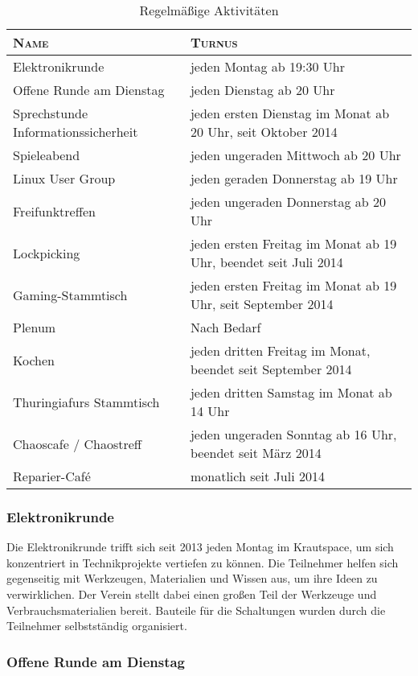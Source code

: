 \documentclass[ngerman]{scrartcl}
\begin{document}
\begin{table}[h]
  \centering{}
	\begin{tabularx}{\textwidth}{l|X}
          \toprule
		\textsc{Name} & \textsc{Turnus} \\ \midrule
		Elektronikrunde & jeden Montag ab 19:30 Uhr\\
		Offene Runde am Dienstag & jeden Dienstag ab 20 Uhr\\
		Sprechstunde Informationssicherheit & jeden ersten Dienstag im Monat ab 20 Uhr, seit Oktober 2014\\ 
		Spieleabend & jeden ungeraden Mittwoch ab 20 Uhr\\
		Linux User Group & jeden geraden Donnerstag ab 19 Uhr\\
		Freifunktreffen & jeden ungeraden Donnerstag ab 20 Uhr\\
		Lockpicking & jeden ersten Freitag im Monat ab 19 Uhr, beendet seit Juli 2014\\
		Gaming-Stammtisch & jeden ersten Freitag im Monat ab 19 Uhr, seit September 2014\\
		Plenum & Nach Bedarf\\
		Kochen & jeden dritten Freitag im Monat, beendet seit September 2014\\
		Thuringiafurs Stammtisch & jeden dritten Samstag im Monat ab 14 Uhr\\
		Chaoscafe / Chaostreff & jeden ungeraden Sonntag ab 16 Uhr, beendet seit März 2014\\
		Reparier-Café & monatlich seit Juli 2014\\
\bottomrule
\end{tabularx}
\caption{Regelmäßige Aktivitäten}
\end{table}

\subsubsection{Elektronikrunde}

Die Elektronikrunde trifft sich seit 2013 jeden Montag im Krautspace, um
sich konzentriert in Technikprojekte vertiefen zu können. Die
Teilnehmer helfen sich gegenseitig mit Werkzeugen, Materialien und
Wissen aus, um ihre Ideen zu verwirklichen. Der Verein stellt dabei
einen großen Teil der Werkzeuge und Verbrauchsmaterialien bereit.
Bauteile für die Schaltungen wurden durch die Teilnehmer selbstständig
organisiert.

\subsubsection{Offene Runde am Dienstag}
\end{document}
